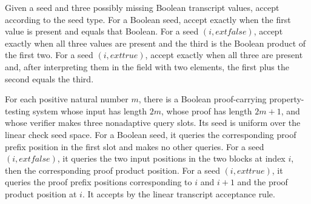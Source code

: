 \begin{definition}
\label{FABL.innerProductLinearTranscriptAccept}
\leanok
{}
Given a seed and three possibly missing Boolean transcript values, accept according to
the seed type. For a Boolean seed, accept exactly when the first value is present and
equals that Boolean. For a seed $(i,	ext{false})$, accept exactly when all three values
are present and the third is the Boolean product of the first two. For a seed
$(i,	ext{true})$, accept exactly when all three are present and, after interpreting them
in the field with two elements, the first plus the second equals the third.
\end{definition}

\begin{definition}
\label{FABL.innerProductLinearPCPPSystem}
\leanok
{}
For each positive natural number $m$, there is a Boolean proof-carrying property-testing
system whose input has length $2m$, whose proof has length $2m+1$, and whose verifier
makes three nonadaptive query slots. Its seed is uniform over the linear check seed
space. For a Boolean seed, it queries the corresponding proof prefix position in the
first slot and makes no other queries. For a seed $(i,	ext{false})$, it queries the two
input positions in the two blocks at index $i$, then the corresponding proof product
position. For a seed $(i,	ext{true})$, it queries the proof prefix positions
corresponding to $i$ and $i+1$ and the proof product position at $i$. It accepts by the
linear transcript acceptance rule.
\end{definition}


